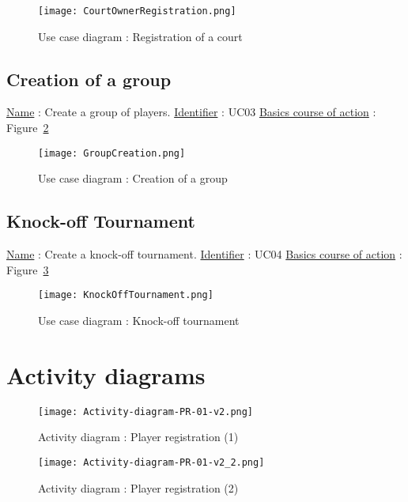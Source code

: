 \begin{figure}[!ht]
    \centering
    \texttt{[image: CourtOwnerRegistration.png]}
    \caption{Use case diagram : Registration of a court}
    \label{courtownerregfig}
\end{figure}
\FloatBarrier

\subsection{Creation of a group}

\noindent \underline{Name} : Create a group of players. \newline
\underline{Identifier} : UC03 \newline
\underline{Basics course of action} : Figure~\ref{groupcreationfig} \newline

\begin{figure}[!ht]
    \centering
    \texttt{[image: GroupCreation.png]}
    \caption{Use case diagram : Creation of a group}
    \label{groupcreationfig}
\end{figure}
\FloatBarrier

\subsection{Knock-off Tournament}

\noindent \underline{Name} : Create a knock-off tournament. \newline
\underline{Identifier} : UC04 \newline
\underline{Basics course of action} : Figure~\ref{knockofftournamentfig}\newline

\begin{figure}[!ht]
    \centering
    \texttt{[image: KnockOffTournament.png]}
    \caption{Use case diagram : Knock-off tournament}
    \label{knockofftournamentfig}
\end{figure}
\FloatBarrier

\section{Activity diagrams}


\begin{figure}[!ht]
    \centering
    \texttt{[image: Activity-diagram-PR-01-v2.png]}
    \caption{Activity diagram : Player registration (1)}
    \texttt{[image: Activity-diagram-PR-01-v2\_2.png]}
    \caption{Activity diagram : Player registration (2)}
\end{figure}

